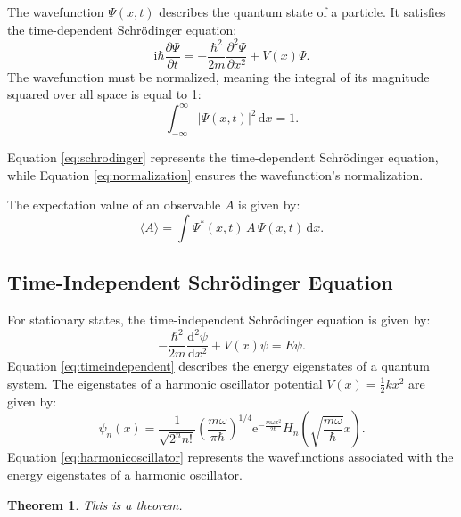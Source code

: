 \documentclass{article}
\newtheorem{theorem}{Theorem}
\newcommand{\ri}{\mathrm{i}}
\newcommand{\re}{\mathrm{e}}
\newcommand{\rd}{\mathrm{d}}
\begin{document}
The wavefunction $\Psi(x,t)$ describes the quantum state of a particle. It
satisfies the time-dependent Schr\"odinger equation:
\begin{equation} \label{eq:schrodinger}
    \ri\hbar \frac{\partial \Psi}{\partial t} = 
    -\frac{\hbar^2}{2m} \frac{\partial^2 \Psi}{\partial x^2} + V(x)\Psi.
\end{equation}
The wavefunction must be normalized, meaning the integral of its magnitude
squared over all space is equal to 1:
\begin{equation} \label{eq:normalization}
    \int_{-\infty}^{\infty} |\Psi(x,t)|^2 \,\rd x = 1.
\end{equation}

Equation \eqref{eq:schrodinger} represents the time-dependent Schrödinger
equation, while Equation \eqref{eq:normalization} ensures the wavefunction's
normalization.

The expectation value of an observable $A$ is given by:
\begin{equation} \label{eq:expectation}
    \langle A \rangle = \int \Psi^*(x,t) \,A\, \Psi(x,t) \,\rd x.
\end{equation}

\subsection{Time-Independent Schrödinger Equation} \label{sec:timeindependent}

For stationary states, the time-independent Schrödinger equation is given by:
\begin{equation} \label{eq:timeindependent}
    -\frac{\hbar^2}{2m} \frac{\rd^2 \psi}{\rd x^2} + V(x)\psi = E\psi.
\end{equation}
Equation \eqref{eq:timeindependent} describes the energy eigenstates of a
quantum system. The eigenstates of a harmonic oscillator potential $V(x) =
\frac{1}{2}kx^2$ are given by:
\begin{equation} \label{eq:harmonicoscillator}
    \psi_n(x) = \frac{1}{\sqrt{2^n n!}} \left(\frac{m\omega}{\pi\hbar}\right)^{1/4} 
    \re^{-\frac{m\omega x^2}{2\hbar}} H_n\left(\sqrt{\frac{m\omega}{\hbar}}x\right).
\end{equation}
Equation \eqref{eq:harmonicoscillator} represents the wavefunctions associated
with the energy eigenstates of a harmonic oscillator.

\begin{theorem} \label{thm:example_1} This is a theorem.
\end{theorem}
\end{document}
